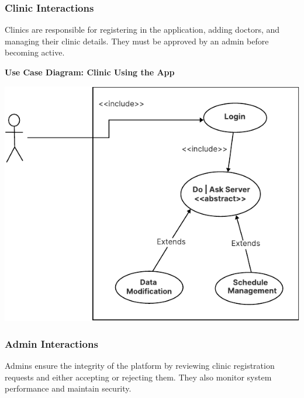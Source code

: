\documentclass[12pt]{report}
\begin{document}
\subsubsection{\textbf{Clinic Interactions}}  
Clinics are responsible for registering in the application, adding doctors, and managing their clinic details. They must be approved by an admin before becoming active.  

\vspace{0.5cm}  
\noindent \textbf{Use Case Diagram: Clinic Using the App}  
\begin{center}
    \includegraphics[width=\textwidth]{images/doctorCAS.pdf} %
\end{center}

\subsubsection{\textbf{Admin Interactions}}  
Admins ensure the integrity of the platform by reviewing clinic registration requests and either accepting or rejecting them. They also monitor system performance and maintain security.  
\end{document}
